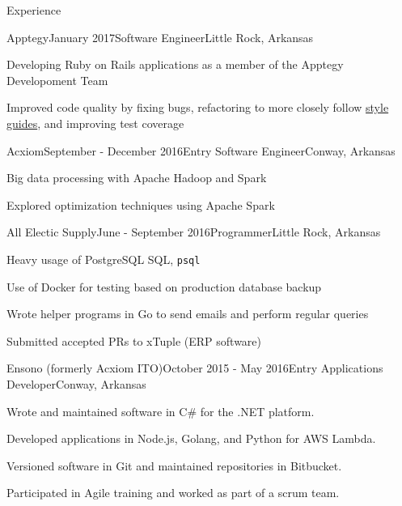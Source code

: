 \documentclass{resume} %
\begin{document}
\begin{rSection}{Experience}

\begin{rSubsection}{Apptegy}{January 2017}{Software Engineer}{Little Rock, Arkansas}

	\item Developing Ruby on Rails applications as a member of the Apptegy Developoment Team
	\item Improved code quality by fixing bugs, refactoring to more closely follow \href{https://github.com/github/rubocop-github/blob/master/STYLEGUIDE.md}{style guides}, and improving test coverage
\end{rSubsection}

\begin{rSubsection}{Acxiom}{September - December 2016}{Entry Software Engineer}{Conway, Arkansas}

	\item Big data processing with Apache Hadoop and Spark
	\item Explored optimization techniques using Apache Spark
\end{rSubsection}


\begin{rSubsection}{All Electic Supply}{June - September 2016}{Programmer}{Little Rock, Arkansas}

	\item Heavy usage of PostgreSQL SQL, {\tt psql}
	\item Use of Docker for testing based on production database backup
	\item Wrote helper programs in Go to send emails and perform regular queries
	\item Submitted accepted PRs to xTuple (ERP software)
\end{rSubsection}

\begin{rSubsection}{Ensono (formerly Acxiom ITO)}{October 2015 - May 2016}{Entry Applications Developer}{Conway, Arkansas}

	\item Wrote and maintained software in C\# for the .NET platform.
	\item Developed applications in Node.js, Golang, and Python for AWS Lambda.
	\item Versioned software in Git and maintained repositories in Bitbucket.
	\item Participated in Agile training and worked as part of a scrum team.
\end{rSubsection}


\end{rSection}
\end{document}
